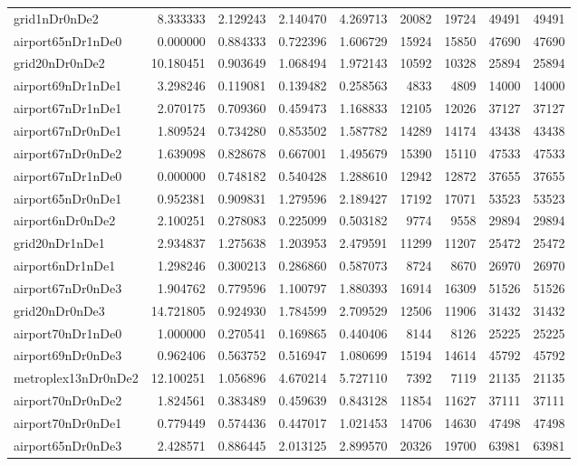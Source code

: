 \begin{longtable}{|l|r|r|r|r|r|r|r|r|}
grid1nDr0nDe2 & 8.333333 & 2.129243 & 2.140470 & 4.269713 & 20082 & 19724 & 49491 & 49491 \\
airport65nDr1nDe0 & 0.000000 & 0.884333 & 0.722396 & 1.606729 & 15924 & 15850 & 47690 & 47690 \\
grid20nDr0nDe2 & 10.180451 & 0.903649 & 1.068494 & 1.972143 & 10592 & 10328 & 25894 & 25894 \\
airport69nDr1nDe1 & 3.298246 & 0.119081 & 0.139482 & 0.258563 & 4833 & 4809 & 14000 & 14000 \\
airport67nDr1nDe1 & 2.070175 & 0.709360 & 0.459473 & 1.168833 & 12105 & 12026 & 37127 & 37127 \\
airport67nDr0nDe1 & 1.809524 & 0.734280 & 0.853502 & 1.587782 & 14289 & 14174 & 43438 & 43438 \\
airport67nDr0nDe2 & 1.639098 & 0.828678 & 0.667001 & 1.495679 & 15390 & 15110 & 47533 & 47533 \\
airport67nDr1nDe0 & 0.000000 & 0.748182 & 0.540428 & 1.288610 & 12942 & 12872 & 37655 & 37655 \\
airport65nDr0nDe1 & 0.952381 & 0.909831 & 1.279596 & 2.189427 & 17192 & 17071 & 53523 & 53523 \\
airport6nDr0nDe2 & 2.100251 & 0.278083 & 0.225099 & 0.503182 & 9774 & 9558 & 29894 & 29894 \\
grid20nDr1nDe1 & 2.934837 & 1.275638 & 1.203953 & 2.479591 & 11299 & 11207 & 25472 & 25472 \\
airport6nDr1nDe1 & 1.298246 & 0.300213 & 0.286860 & 0.587073 & 8724 & 8670 & 26970 & 26970 \\
airport67nDr0nDe3 & 1.904762 & 0.779596 & 1.100797 & 1.880393 & 16914 & 16309 & 51526 & 51526 \\
grid20nDr0nDe3 & 14.721805 & 0.924930 & 1.784599 & 2.709529 & 12506 & 11906 & 31432 & 31432 \\
airport70nDr1nDe0 & 1.000000 & 0.270541 & 0.169865 & 0.440406 & 8144 & 8126 & 25225 & 25225 \\
airport69nDr0nDe3 & 0.962406 & 0.563752 & 0.516947 & 1.080699 & 15194 & 14614 & 45792 & 45792 \\
metroplex13nDr0nDe2 & 12.100251 & 1.056896 & 4.670214 & 5.727110 & 7392 & 7119 & 21135 & 21135 \\
airport70nDr0nDe2 & 1.824561 & 0.383489 & 0.459639 & 0.843128 & 11854 & 11627 & 37111 & 37111 \\
airport70nDr0nDe1 & 0.779449 & 0.574436 & 0.447017 & 1.021453 & 14706 & 14630 & 47498 & 47498 \\
airport65nDr0nDe3 & 2.428571 & 0.886445 & 2.013125 & 2.899570 & 20326 & 19700 & 63981 & 63981 \\

\end{longtable}
